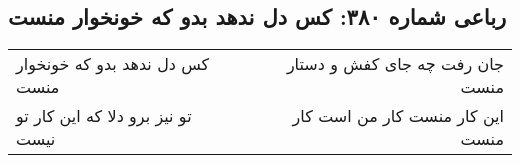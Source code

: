 \begin{center}
\section*{رباعی شماره ۳۸۰: کس دل ندهد بدو که خونخوار منست}
\label{sec:0380}
\begin{longtable}{l p{0.5cm} r}
کس دل ندهد بدو که خونخوار منست
&&
جان رفت چه جای کفش و دستار منست
\\
تو نیز برو دلا که این کار تو نیست
&&
این کار منست کار من است کار منست
\\
\end{longtable}
\end{center}
